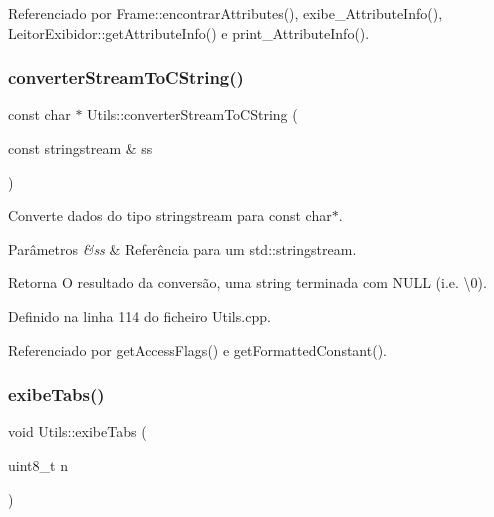 Referenciado por Frame\+::encontrar\+Attributes(), exibe\+\_\+\+Attribute\+Info(), Leitor\+Exibidor\+::get\+Attribute\+Info() e print\+\_\+\+Attribute\+Info().

\mbox{\label{classUtils_abef6742f09f81fea5952454925325ea5}} 
\subsubsection{\texorpdfstring{converter\+Stream\+To\+C\+String()}{converterStreamToCString()}}
{\footnotesize\ttfamily const char $\ast$ Utils\+::converter\+Stream\+To\+C\+String (\begin{DoxyParamCaption}\item[{const stringstream \&}]{ss }\end{DoxyParamCaption})\hspace{0.3cm}{\ttfamily [static]}}

Converte dados do tipo stringstream para {\ttfamily const} {\ttfamily char$\ast$}. 
\begin{DoxyParams}{Parâmetros}
{\em \&ss} & Referência para um {\ttfamily std\+::stringstream}. \\
\hline
\end{DoxyParams}
\begin{DoxyReturn}{Retorna}
O resultado da conversão, uma string terminada com N\+U\+LL (i.\+e. \textbackslash{}0). 
\end{DoxyReturn}


Definido na linha 114 do ficheiro Utils.\+cpp.



Referenciado por get\+Access\+Flags() e get\+Formatted\+Constant().

\mbox{\label{classUtils_a2a13f135d652b68fae6f4b8a9b21464e}} 
\subsubsection{\texorpdfstring{exibe\+Tabs()}{exibeTabs()}\hspace{0.1cm}{\footnotesize\ttfamily [1/2]}}
{\footnotesize\ttfamily void Utils\+::exibe\+Tabs (\begin{DoxyParamCaption}\item[{uint8\+\_\+t}]{n }\end{DoxyParamCaption})\hspace{0.3cm}{\ttfamily [static]}}

